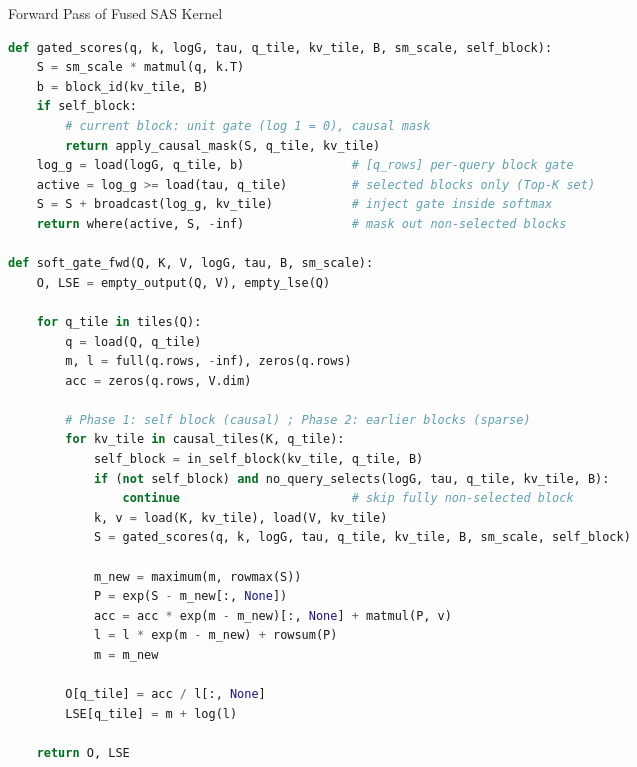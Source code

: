 \begin{algorithm}
\caption{Forward Pass of Fused SAS Kernel}
\label{alg:soft_gate_fwd}
\begin{lstlisting}[language=python]
def gated_scores(q, k, logG, tau, q_tile, kv_tile, B, sm_scale, self_block):
    S = sm_scale * matmul(q, k.T)
    b = block_id(kv_tile, B)
    if self_block:
        # current block: unit gate (log 1 = 0), causal mask
        return apply_causal_mask(S, q_tile, kv_tile)
    log_g = load(logG, q_tile, b)               # [q_rows] per-query block gate
    active = log_g >= load(tau, q_tile)         # selected blocks only (Top-K set)
    S = S + broadcast(log_g, kv_tile)           # inject gate inside softmax
    return where(active, S, -inf)               # mask out non-selected blocks

def soft_gate_fwd(Q, K, V, logG, tau, B, sm_scale):
    O, LSE = empty_output(Q, V), empty_lse(Q)

    for q_tile in tiles(Q):
        q = load(Q, q_tile)
        m, l = full(q.rows, -inf), zeros(q.rows)
        acc = zeros(q.rows, V.dim)

        # Phase 1: self block (causal) ; Phase 2: earlier blocks (sparse)
        for kv_tile in causal_tiles(K, q_tile):
            self_block = in_self_block(kv_tile, q_tile, B)
            if (not self_block) and no_query_selects(logG, tau, q_tile, kv_tile, B):
                continue                        # skip fully non-selected block
            k, v = load(K, kv_tile), load(V, kv_tile)
            S = gated_scores(q, k, logG, tau, q_tile, kv_tile, B, sm_scale, self_block)

            m_new = maximum(m, rowmax(S))
            P = exp(S - m_new[:, None])
            acc = acc * exp(m - m_new)[:, None] + matmul(P, v)
            l = l * exp(m - m_new) + rowsum(P)
            m = m_new

        O[q_tile] = acc / l[:, None]
        LSE[q_tile] = m + log(l)

    return O, LSE
\end{lstlisting}
\end{algorithm}

